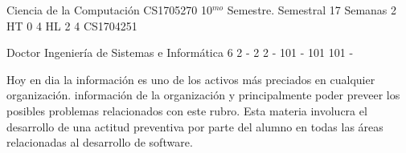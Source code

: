 \documentclass[a4paper,8pt]{article}
\begin{document}
\setNombreProfesor{}
\setGradoProfesorAbreviado{}
\sylabusHeader

\academicaTable
{Ciencia de la Computación} %
{CS1705270} %
{10$^{mo}$ Semestre.} %
{Semestral} %
{17 Semanas} %
{2 HT} %
{} %
{0} %
{4 HL}  %
{2} %
{4} %
{CS1704251} %

\administrativaTable
{Doctor} %
{Ingeniería de Sistemas e Informática} %
{6} %
{2} %
{-} %
{2} %
{2} %
{-} %
{101} %
{-} %
{101} %
{101} %
{-} %


\begin{fundamentacion}
Hoy en dia la información es uno de los activos más preciados en cualquier organización.
información de la organización y principalmente poder preveer los posibles problemas relacionados con este rubro.
Esta materia involucra el desarrollo de una actitud preventiva por parte del alumno en todas las áreas
relacionadas al desarrollo de software.

\end{fundamentacion}

\begin{sumilla}
\item \IASFoundationalConceptsinSecurity
\item \IASPrinciplesofSecureDesign
\item \IASDefensiveProgramming
\item \IASThreatsandAttacks
\item \IASNetworkSecurity
\item \IASCryptography
\item \IASWebSecurity
\item \IASPlatformSecurity
\item \IASDigitalForensics
\item \IASSecureSoftwareEngineering

\end{sumilla}
\end{document}
